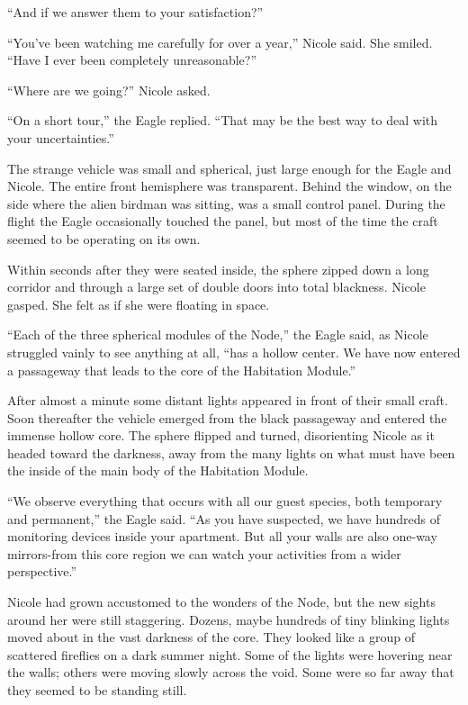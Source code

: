 \documentclass[]{article}
\begin{document}
{“And if we answer them to your satisfaction?”

“You’ve been watching me carefully for over a year,” Nicole said.  She smiled.  “Have I ever been completely unreasonable?”

“Where are we going?” Nicole asked.

“On a short tour,” the Eagle replied.  “That may be the best way to deal with your uncertainties.”

The strange vehicle was small and spherical, just large enough for the Eagle and Nicole.  The entire front hemisphere was transparent.  Behind the window, on the side where the alien birdman was sitting, was a small control panel.  During the flight the Eagle occasionally touched the panel, but most of the time the craft seemed to be operating on its own.

Within seconds after they were seated inside, the sphere zipped down a long corridor and through a large set of double doors into total blackness.  Nicole gasped.  She felt as if she were floating in space.

“Each of the three spherical modules of the Node,” the Eagle said, as Nicole struggled vainly to see anything at all, “has a hollow center.  We have now entered a passageway that leads to the core of the Habitation Module.”

After almost a minute some distant lights appeared in front of their small craft.  Soon thereafter the vehicle emerged from the black passageway and entered the immense hollow core.  The sphere flipped and turned, disorienting Nicole as it headed toward the darkness, away from the many lights on what must have been the inside of the main body of the Habitation Module.

“We observe everything that occurs with all our guest species, both temporary and permanent,” the Eagle said.  “As you have suspected, we have hundreds of monitoring devices inside your apartment.  But all your walls are also one-way mirrors-from this core region we can watch your activities from a wider perspective.”

Nicole had grown accustomed to the wonders of the Node, but the new sights around her were still staggering.  Dozens, maybe hundreds of tiny blinking lights moved about in the vast darkness of the core.  They looked like a group of scattered fireflies on a dark summer night.  Some of the lights were hovering near the walls; others were moving slowly across the void.  Some were so far away that they seemed to be standing still.

}
\end{document}
